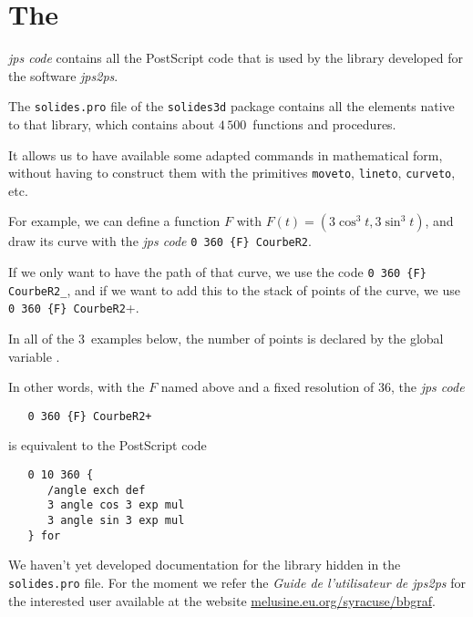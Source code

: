 \section{The }

\textit{jps code} contains all the  PostScript code that is used by the library
developed for the software \textit{jps2ps}.

The \texttt{solides.pro} file of the \texttt{solides3d} package
contains all the elements native
to that library, which contains about $4\, 500$~functions and
procedures.

It allows us to have available some adapted commands in mathematical form, without
having to construct them with the primitives
 \verb+moveto+, \verb+lineto+, \verb+curveto+, etc.

For example, we can define a function $F$ with $F(t) =
(3\cos^3 t, 3\sin^3 t)$, and draw its curve
with the \textit{jps code} \verb+0 360 {F} CourbeR2+.

If we only want to have the path of that curve, we use the code
\verb+0 360 {F} CourbeR2_+,
and if we want to add this to the stack of points of the curve,
we use \verb+0 360 {F} CourbeR2++.

In all of the $3$~examples below, the number of points is declared by the global
variable .

In other words, with the  $F$ named above and a fixed resolution of 36, the \textit{jps code}
\begin{verbatim}
   0 360 {F} CourbeR2+
\end{verbatim}
is equivalent to the PostScript code
\begin{verbatim}
   0 10 360 {
      /angle exch def
      3 angle cos 3 exp mul
      3 angle sin 3 exp mul
   } for
\end{verbatim}

We haven't yet developed documentation for the library hidden in the
\texttt{solides.pro} file. For the moment we refer the
\textit{Guide de l'utilisateur de jps2ps} for the interested user
available at the website  \url{melusine.eu.org/syracuse/bbgraf}.

\endinput
